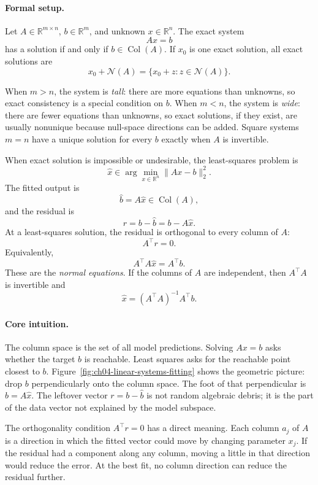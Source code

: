 \paragraph{Formal setup.}
Let \(A\in\mathbb{R}^{m\times n}\), \(b\in\mathbb{R}^m\), and unknown \(x\in\mathbb{R}^n\). The exact system
\[
Ax=b
\]
has a solution if and only if \(b\in\operatorname{Col}(A)\). If \(x_0\) is one exact solution, all exact solutions are
\[
x_0+\mathcal{N}(A)=\{x_0+z:z\in\mathcal{N}(A)\}.
\]

When \(m>n\), the system is \emph{tall}: there are more equations than unknowns, so exact consistency is a special condition on \(b\). When \(m<n\), the system is \emph{wide}: there are fewer equations than unknowns, so exact solutions, if they exist, are usually nonunique because null-space directions can be added. Square systems \(m=n\) have a unique solution for every \(b\) exactly when \(A\) is invertible.

When exact solution is impossible or undesirable, the least-squares problem is
\[
\hat x\in\arg\min_{x\in\mathbb{R}^n}\|Ax-b\|_2^2.
\]
The fitted output is
\[
\hat b=A\hat x\in\operatorname{Col}(A),
\]
and the residual is
\[
r=b-\hat b=b-A\hat x.
\]
At a least-squares solution, the residual is orthogonal to every column of \(A\):
\[
A^\top r=0.
\]
Equivalently,
\[
A^\top A\hat x=A^\top b.
\]
These are the \emph{normal equations}. If the columns of \(A\) are independent, then \(A^\top A\) is invertible and
\[
\hat x=(A^\top A)^{-1}A^\top b.
\]

\paragraph{Core intuition.}
The column space is the set of all model predictions. Solving \(Ax=b\) asks whether the target \(b\) is reachable. Least squares asks for the reachable point closest to \(b\). Figure~\ref{fig:ch04-linear-systems-fitting} shows the geometric picture: drop \(b\) perpendicularly onto the column space. The foot of that perpendicular is \(\hat b=A\hat x\). The leftover vector \(r=b-\hat b\) is not random algebraic debris; it is the part of the data vector not explained by the model subspace.

The orthogonality condition \(A^\top r=0\) has a direct meaning. Each column \(a_j\) of \(A\) is a direction in which the fitted vector could move by changing parameter \(x_j\). If the residual had a component along any column, moving a little in that direction would reduce the error. At the best fit, no column direction can reduce the residual further.

